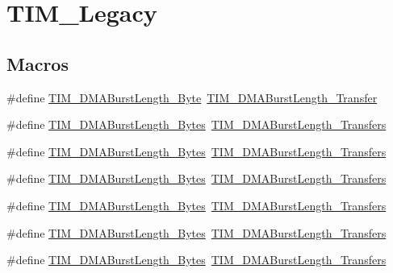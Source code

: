 \hypertarget{group___t_i_m___legacy}{}\section{T\+I\+M\+\_\+\+Legacy}
\label{group___t_i_m___legacy}
\subsection*{Macros}
\begin{DoxyCompactItemize}
\item 
\#define \hyperlink{group___t_i_m___legacy_gad915c67fae262b887f4f074809448309}{T\+I\+M\+\_\+\+D\+M\+A\+Burst\+Length\+\_\+Byte}~\hyperlink{group___t_i_m___d_m_a___burst___length_gab87f91f1c5583b9888cb6bb37fc639e2}{T\+I\+M\+\_\+\+D\+M\+A\+Burst\+Length\+\_\+Transfer}
\item 
\#define \hyperlink{group___t_i_m___legacy_gabed2d89b663148923f4a7ca63d62d947}{T\+I\+M\+\_\+\+D\+M\+A\+Burst\+Length\+\_\+Bytes}~\hyperlink{group___t_i_m___d_m_a___burst___length_ga829504c3e8c90a9445f6a223bc3034f8}{T\+I\+M\+\_\+\+D\+M\+A\+Burst\+Length\+\_\+Transfers}
\item 
\#define \hyperlink{group___t_i_m___legacy_gad06dbc68a994da99b017a18a7197c0ad}{T\+I\+M\+\_\+\+D\+M\+A\+Burst\+Length\+\_\+Bytes}~\hyperlink{group___t_i_m___d_m_a___burst___length_ga3a99863a0925e0cc9a11b91aade66f11}{T\+I\+M\+\_\+\+D\+M\+A\+Burst\+Length\+\_\+Transfers}
\item 
\#define \hyperlink{group___t_i_m___legacy_ga620ce560a1d7a6d6769cacd2a2ead48d}{T\+I\+M\+\_\+\+D\+M\+A\+Burst\+Length\+\_\+Bytes}~\hyperlink{group___t_i_m___d_m_a___burst___length_ga84bfeb309593a1ac580e233bf7514b36}{T\+I\+M\+\_\+\+D\+M\+A\+Burst\+Length\+\_\+Transfers}
\item 
\#define \hyperlink{group___t_i_m___legacy_gaf9ac4a4cfd3dcfb7ba859898e702c881}{T\+I\+M\+\_\+\+D\+M\+A\+Burst\+Length\+\_\+Bytes}~\hyperlink{group___t_i_m___d_m_a___burst___length_ga44f8aa51fbe8887a5f3c37a0e776902c}{T\+I\+M\+\_\+\+D\+M\+A\+Burst\+Length\+\_\+Transfers}
\item 
\#define \hyperlink{group___t_i_m___legacy_ga7a9cc659b4fc010a31815254f6b57e3f}{T\+I\+M\+\_\+\+D\+M\+A\+Burst\+Length\+\_\+Bytes}~\hyperlink{group___t_i_m___d_m_a___burst___length_ga8be40a21654eea72e9c1bf9922675b22}{T\+I\+M\+\_\+\+D\+M\+A\+Burst\+Length\+\_\+Transfers}
\item 
\#define \hyperlink{group___t_i_m___legacy_ga5833cc5442c40a97a6a90bcd34a2e773}{T\+I\+M\+\_\+\+D\+M\+A\+Burst\+Length\+\_\+Bytes}~\hyperlink{group___t_i_m___d_m_a___burst___length_gaf2ae83bd73b0e92b73e5ebfc11f9bfad}{T\+I\+M\+\_\+\+D\+M\+A\+Burst\+Length\+\_\+Transfers}

\end{DoxyCompactItemize}
